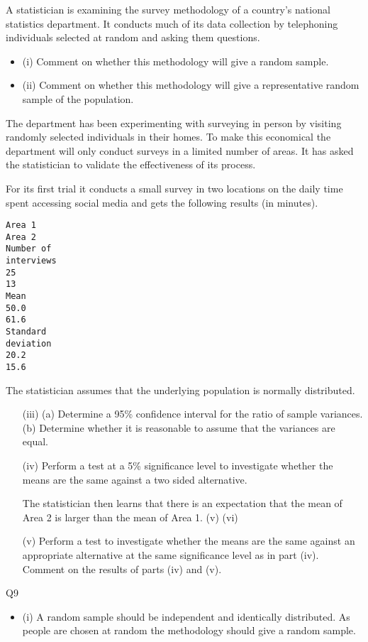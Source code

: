 \documentclass[a4paper,12pt]{article}
\begin{document}
\begin{enumerate}
A statistician is examining the survey methodology of a country’s national statistics department. It conducts much of its data collection by telephoning individuals
selected at random and asking them questions.
\begin{itemize}
\item (i) Comment on whether this methodology will give a random sample.

\item (ii) Comment on whether this methodology will give a representative random
sample of the population.
\end{itemize}
\medskip
The department has been experimenting with surveying in person by visiting randomly selected individuals in their homes. To make this economical the
department will only conduct surveys in a limited number of areas. It has asked the
statistician to validate the effectiveness of its process.

For its first trial it conducts a small survey in two locations on the daily time spent accessing social media and gets the following results (in minutes).
\begin{verbatim}
Area 1
Area 2
Number of
interviews
25
13
Mean
50.0
61.6
Standard
deviation
20.2
15.6
\end{verbatim}
The statistician assumes that the underlying population is normally distributed.
\begin{itemize}
\item[(iii)]
(a) Determine a 95\% confidence interval for the ratio of sample variances.
(b) Determine whether it is reasonable to assume that the variances are
equal.
\item[(iv)]
Perform a test at a 5\% significance level to investigate whether the means are
the same against a two sided alternative.

The statistician then learns that there is an expectation that the mean of Area 2 is
larger than the mean of Area 1.
(v)
(vi)
\item[(v)]Perform a test to investigate whether the means are the same against an
appropriate alternative at the same significance level as in part (iv).
Comment on the results of parts (iv) and (v).

\end{itemize}

\newpage 
Q9
\begin{itemize}
\item (i) A random sample should be independent and identically distributed. As
people are chosen at random the methodology should give a random sample.


\end{itemize}
\end{enumerate}
\end{document}
